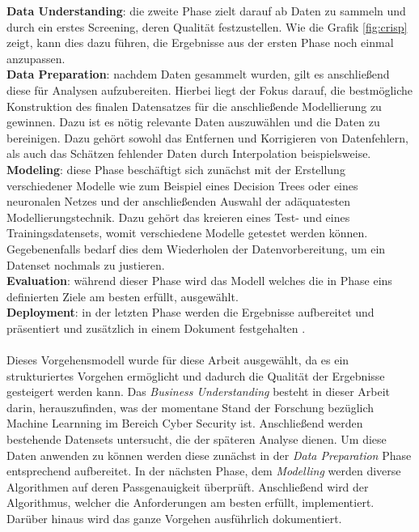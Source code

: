 \documentclass[
    12pt, %
    DIV10,
    ngerman, %
    a4paper, %
    oneside, %
    titlepage, %
    parskip=half, %
    headings=normal, %
    listof=totoc, %
    bibliography=totoc, %
    index=totoc, %
    captions=tableheading, %
    final %
]{scrreprt}
\begin{document}
\textbf{Data Understanding}: die zweite Phase zielt darauf ab Daten zu sammeln und durch ein erstes Screening, deren Qualität festzustellen. Wie die Grafik \ref{fig:crisp} zeigt, kann dies dazu führen, die Ergebnisse aus der ersten Phase noch einmal anzupassen.\\ 
\textbf{Data Preparation}: nachdem Daten gesammelt wurden, gilt es anschlie{\ss}end diese für Analysen aufzubereiten. Hierbei liegt der Fokus darauf, die bestmögliche Konstruktion des finalen Datensatzes für die anschlie{\ss}ende Modellierung zu gewinnen. Dazu ist es nötig relevante Daten auszuwählen und die Daten zu bereinigen. Dazu gehört sowohl das Entfernen und Korrigieren von Datenfehlern, als auch das Schätzen fehlender Daten durch Interpolation beispielsweise.\\
\textbf{Modeling}: diese Phase beschäftigt sich zunächst mit der Erstellung verschiedener Modelle wie zum Beispiel eines Decision Trees oder eines neuronalen Netzes und der anschlie{\ss}enden Auswahl der adäquatesten Modellierungstechnik. Dazu gehört das kreieren eines Test- und eines Trainingsdatensets, womit verschiedene Modelle getestet werden können. Gegebenenfalls bedarf dies dem Wiederholen der Datenvorbereitung, um ein Datenset nochmals zu justieren.\\
\textbf{Evaluation}: während dieser Phase wird das Modell welches die in Phase eins definierten Ziele am besten erfüllt, ausgewählt.\\
\textbf{Deployment}: in der letzten Phase werden die Ergebnisse aufbereitet und präsentiert und zusätzlich in einem Dokument festgehalten \parencite{SmartVisionEurop}.\\\\
Dieses Vorgehensmodell wurde für diese Arbeit ausgewählt, da es ein strukturiertes Vorgehen ermöglicht und dadurch die Qualität der Ergebnisse gesteigert werden kann. Das \emph{Business Understanding} besteht in dieser Arbeit darin, herauszufinden, was der momentane Stand der Forschung bezüglich Machine Learnning im Bereich Cyber Security ist. Anschlie{\ss}end werden bestehende Datensets untersucht, die der späteren Analyse dienen.
Um diese Daten anwenden zu können werden diese zunächst in der \emph{Data Preparation} Phase entsprechend aufbereitet. In der nächsten Phase, dem \emph{Modelling} werden diverse Algorithmen auf deren Passgenauigkeit überprüft. Anschlie{\ss}end wird der Algorithmus, welcher die Anforderungen am besten erfüllt, implementiert. Darüber hinaus wird das ganze Vorgehen ausführlich dokumentiert.
\end{document}
